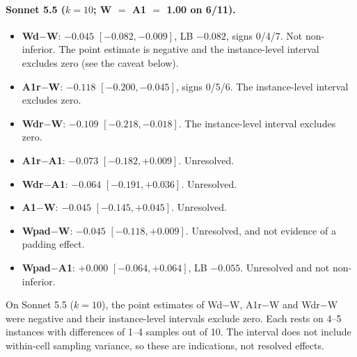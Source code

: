 \paragraph{Sonnet 5.5 ($k=10$; W $=$ A1 $=$ 1.00 on 6/11).}
\begin{itemize}
\item \textbf{Wd$-$W}: $-0.045$ $[-0.082, -0.009]$, LB $-0.082$, signs 0/4/7. Not non-inferior. The point estimate is negative and the instance-level interval excludes zero (see the caveat below).
\item \textbf{A1r$-$W}: $-0.118$ $[-0.200, -0.045]$, signs 0/5/6. The instance-level interval excludes zero.
\item \textbf{Wdr$-$W}: $-0.109$ $[-0.218, -0.018]$. The instance-level interval excludes zero.
\item \textbf{A1r$-$A1}: $-0.073$ $[-0.182, +0.009]$. Unresolved.
\item \textbf{Wdr$-$A1}: $-0.064$ $[-0.191, +0.036]$. Unresolved.
\item \textbf{A1$-$W}: $-0.045$ $[-0.145, +0.045]$. Unresolved.
\item \textbf{Wpad$-$W}: $-0.045$ $[-0.118, +0.009]$. Unresolved, and not evidence of a padding effect.
\item \textbf{Wpad$-$A1}: $+0.000$ $[-0.064, +0.064]$, LB $-0.055$. Unresolved and not non-inferior.
\end{itemize}
On Sonnet 5.5 ($k=10$), the point estimates of Wd$-$W, A1r$-$W and Wdr$-$W were negative and their instance-level intervals exclude zero. Each rests on 4--5 instances with differences of 1--4 samples out of 10. The interval does not include within-cell sampling variance, so these are indications, not resolved effects.

